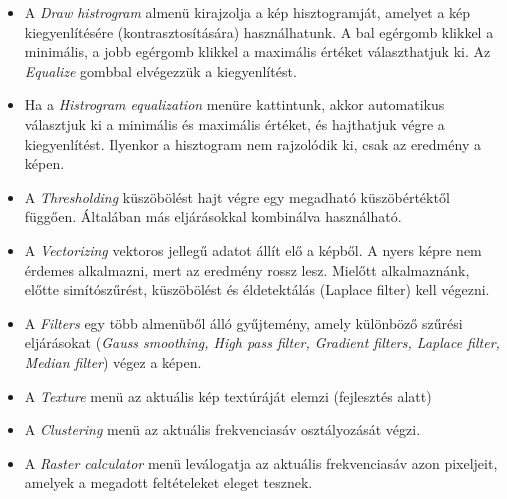 \documentclass[a4paper,12pt]{book}
\begin{document}
\begin{itemize}
	
	\item A \textit{Draw histrogram} almenü kirajzolja a kép hisztogramját, amelyet a kép kiegyenlítésére (kontrasztosítására) használhatunk. A bal egérgomb klikkel a minimális, a jobb egérgomb klikkel a maximális értéket választhatjuk ki. Az \textit{Equalize} gombbal elvégezzük a kiegyenlítést. 
%	
	\item Ha a \textit{Histrogram equalization} menüre kattintunk, akkor automatikus választjuk ki a minimális és maximális értéket, és hajthatjuk végre a kiegyenlítést. Ilyenkor a hisztogram nem rajzolódik ki, csak az eredmény a képen.
	
	\item A \textit{Thresholding} küszöbölést hajt végre egy megadható küszöbértéktől függően. Általában más eljárásokkal kombinálva használható.
	
	\item A \textit{Vectorizing} vektoros jellegű adatot állít elő a képből. A nyers képre nem érdemes alkalmazni, mert az eredmény rossz lesz. Mielőtt alkalmaznánk, előtte simítószűrést, küszöbölést és éldetektálás (Laplace filter) kell végezni. 
		
	\item A \textit{Filters} egy több almenüből álló gyűjtemény, amely különböző szűrési eljárásokat (\textit{Gauss smoothing, High pass filter, Gradient filters, Laplace filter, Median filter}) végez a képen. 
		
	\item A \textit{Texture} menü az aktuális kép textúráját elemzi (fejlesztés alatt)
	
	
	\item A \textit{Clustering} menü az aktuális frekvenciasáv  osztályozását végzi.
	
	\item A \textit{Raster calculator} menü leválogatja az aktuális frekvenciasáv azon pixeljeit, amelyek a megadott  feltételeket eleget tesznek.
	

\end{itemize}
	
\end{document}
